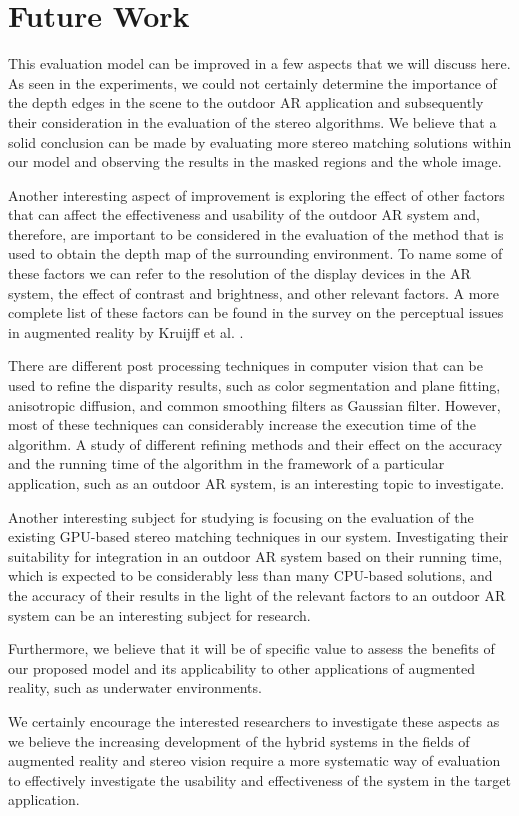 \section{Future Work}
This evaluation model can be improved in a few aspects that we will discuss here.
As seen in the experiments, we could not certainly determine the importance of the depth edges in the scene to the outdoor AR application and subsequently their consideration in the evaluation 
of the stereo algorithms. We believe that a solid conclusion can be made by evaluating more stereo matching solutions
within our model and observing the results in the masked regions and the whole image.

Another interesting aspect of improvement is exploring the effect of other factors that can affect the effectiveness and usability of the outdoor AR system and, therefore, 
are important to be considered in the evaluation of the method that is used to obtain the depth map of the surrounding environment. To name some of these factors we can refer to
the resolution of the display devices in the AR system, the effect of contrast and brightness, and other relevant factors. A more complete list of these factors can be
found in the survey on the perceptual issues in augmented reality by Kruijff et al. \cite{kru10}.

There are different post processing techniques in computer vision that can be used to refine the disparity results, such as color segmentation and plane fitting, 
anisotropic diffusion, and common smoothing filters as Gaussian filter. However, most of these techniques can considerably increase the execution time of the algorithm.
A study of different refining methods and their effect on the accuracy and the running time of the algorithm in the framework of a particular application, 
such as an outdoor AR system, is an interesting topic to investigate.

Another interesting subject for studying is focusing on the evaluation of the existing GPU-based stereo matching techniques in our system.
Investigating their suitability for integration in an outdoor AR system based on their running time, which is expected to be considerably less than many CPU-based solutions, 
and the accuracy of their results in the light of the relevant factors to an outdoor AR system can be an interesting subject for research.

Furthermore, we believe that it will be of specific value to
assess the benefits of our proposed model and its applicability to other applications of augmented reality, such as underwater environments. 

We certainly encourage the 
interested researchers to investigate these aspects as we believe the increasing development of the hybrid systems in the fields of augmented reality and stereo vision 
require a more systematic way of evaluation to effectively investigate the usability and effectiveness of the system in the target application.



